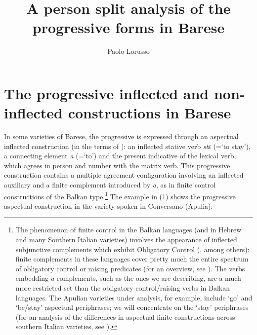 \documentclass[output=paper]{langsci/langscibook}
\author{Paolo Lorusso\affiliation{IUSS, Pavia}}
\title{A person split analysis of the progressive forms in Barese}
\begin{document}

 

 

 

\section{The progressive inflected and non-inflected constructions in Barese}%

In some varieties of Barese, the progressive is expressed through an aspectual inflected construction (in the terms of \citealt{Manzini2005}): an inflected stative verb \textit{stɛ} (=‘to stay’), a connecting element \textit{a} (=‘to’) and the present indicative of the lexical verb, which agrees in person and number with the matrix verb. This progressive construction contains a multiple agreement configuration involving an inflected auxiliary and a finite complement introduced by \textit{a}, as in finite control constructions of the Balkan type.\footnote{The phenomenon of finite control in the Balkan languages (and in Hebrew and many Southern Italian varieties) involves the appearance of inflected subjunctive complements which exhibit Obligatory Control (\citealt{Landau2004}, among others): finite complements in these languages cover pretty much the entire spectrum of obligatory control or raising predicates (for an overview, see \citealt{Ledgeway2015,Manzini2017}). The verbs embedding \textit{a} complements, such as the ones we are describing, are a much more restricted set than the obligatory control\slash raising verbs in Balkan languages. The Apulian varieties under analysis, for example, include ‘go’ and ‘be\slash stay’ aspectual periphrases; we will concentrate on the ‘stay’ periphrases (for an analysis of the differences in aspectual finite constructions across southern Italian varieties, see \citealt{Manzini2017}).}  The example in (1) shows the progressive aspectual construction in the variety spoken in Conversano (Apulia): 
\end{document}
